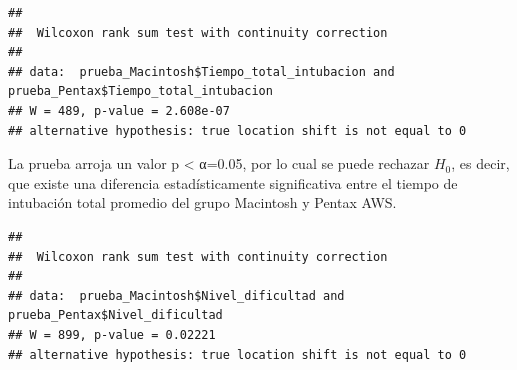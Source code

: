 \documentclass[
]{article}
\newenvironment{Shaded}{\begin{snugshade}}{\end{snugshade}}
\newcommand{\CommentTok}[1]{\textcolor[rgb]{0.56,0.35,0.01}{\textit{#1}}}
\newcommand{\FunctionTok}[1]{\textcolor[rgb]{0.13,0.29,0.53}{\textbf{#1}}}
\newcommand{\NormalTok}[1]{#1}
\newcommand{\SpecialCharTok}[1]{\textcolor[rgb]{0.81,0.36,0.00}{\textbf{#1}}}
\begin{document}
\begin{Shaded}
\end{Shaded}

\begin{verbatim}
## 
##  Wilcoxon rank sum test with continuity correction
## 
## data:  prueba_Macintosh$Tiempo_total_intubacion and prueba_Pentax$Tiempo_total_intubacion
## W = 489, p-value = 2.608e-07
## alternative hypothesis: true location shift is not equal to 0
\end{verbatim}

La prueba arroja un valor p \textless{} α=0.05, por lo cual se puede
rechazar \(H_0\), es decir, que existe una diferencia estadísticamente
significativa entre el tiempo de intubación total promedio del grupo
Macintosh y Pentax AWS.

\begin{Shaded}
\end{Shaded}

\begin{verbatim}
## 
##  Wilcoxon rank sum test with continuity correction
## 
## data:  prueba_Macintosh$Nivel_dificultad and prueba_Pentax$Nivel_dificultad
## W = 899, p-value = 0.02221
## alternative hypothesis: true location shift is not equal to 0
\end{verbatim}

\begin{Shaded}
\end{Shaded}
\end{document}

